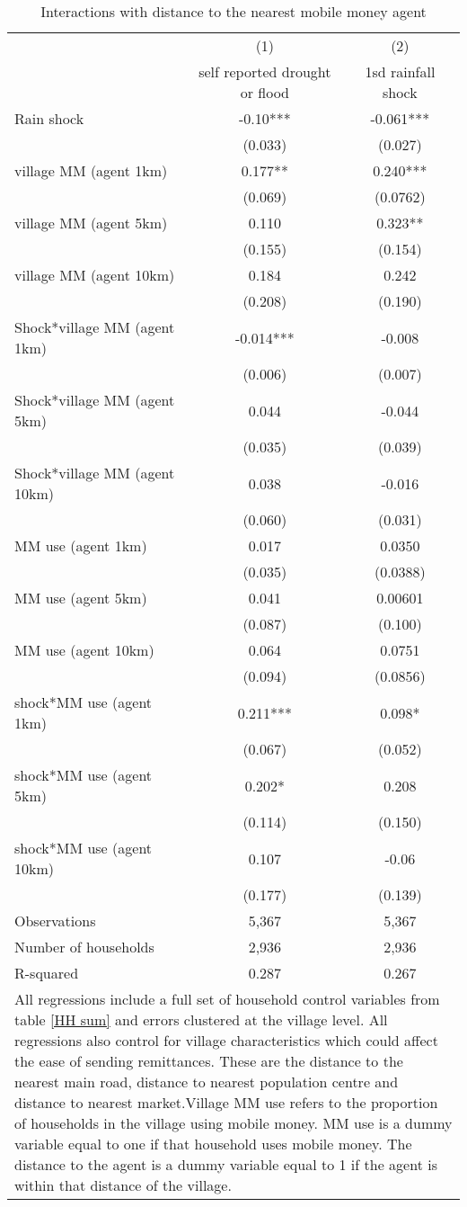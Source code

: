 \begin{table}
\centering \caption{Interactions with distance to the nearest mobile money agent} \label{distance}
\def\arraystretch{0.80}
\begin{tabular}{lcc} \hline
 & (1) & (2) \\
 & self reported drought or flood & 1sd rainfall shock \\ \hline
Rain shock & -0.10*** & -0.061*** \\
& (0.033) & (0.027) \\
village MM (agent 1km) & 0.177** & 0.240*** \\
 & (0.069) & (0.0762) \\
village MM (agent 5km) & 0.110 & 0.323** \\
 & (0.155) & (0.154) \\
village MM (agent 10km) & 0.184 & 0.242 \\
 & (0.208) & (0.190) \\
Shock*village MM (agent 1km)  & -0.014*** &  -0.008 \\
 & (0.006) &  (0.007)  \\
Shock*village MM (agent 5km) & 0.044 & -0.044 \\
 & (0.035) & (0.039)  \\
Shock*village MM (agent 10km)  & 0.038 & -0.016 \\
 & (0.060) &  (0.031) \\
MM use (agent 1km)  & 0.017 & 0.0350 \\
 & (0.035) & (0.0388) \\
MM use (agent 5km) & 0.041 & 0.00601 \\
 & (0.087) & (0.100) \\
MM use (agent 10km) & 0.064 & 0.0751 \\
 & (0.094) & (0.0856) \\
shock*MM use (agent 1km) & 0.211*** &  0.098*  \\
 & (0.067) &  (0.052) \\
shock*MM use (agent 5km) & 0.202* & 0.208 \\
 & (0.114) & (0.150) \\
shock*MM use (agent 10km) & 0.107 &  -0.06   \\
 & (0.177) &  (0.139) \\
Observations & 5,367 & 5,367 \\
Number of households & 2,936 & 2,936 \\
R-squared & 0.287 & 0.267 \\
  \hline
\multicolumn{3}{p{14cm}}{All regressions include a full set of household control variables from table \ref{HH sum} and errors clustered at the village level.  All regressions also control for village characteristics which could affect the ease of sending remittances. These are the distance to the nearest main road, distance to nearest population centre and distance to nearest market.Village MM use refers to the proportion of households in the village using mobile money. MM use is a dummy variable equal to one if that household uses mobile money. The distance to the agent is a dummy variable equal to 1 if the agent is within that distance of the village.} \\

\end{tabular}
\end{table}
